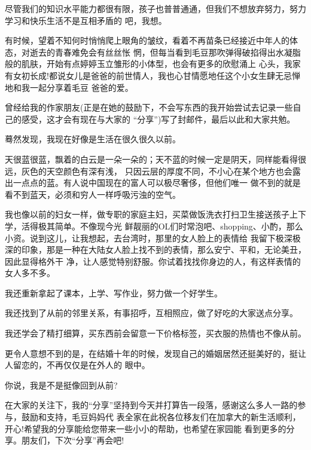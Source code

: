 \documentclass[11pt,a4paper,onecolumn]{article}
\begin{document}
尽管我们的知识水平能力都很有限，孩子也普普通通，但我们不想放弃努力，努力学习和快乐生活不是互相矛盾的
吧，我想。



有时候，望着不知何时悄悄爬上眼角的皱纹，看着不再苗条已经接近中年人的体态，对逝去的青春难免会有丝丝怅
惘，但每当看到毛豆那吹弹得破掐得出水凝脂般的肌肤，开始有点婷婷玉立雏形的小体型，也会有更多的欣慰涌上
心头，我家有女初长成!都说女儿是爸爸的前世情人，我也心甘情愿地任这个小女生肆无忌惮地和我一起分享着毛豆
爸爸的爱。


曾经给我的作家朋友(正是在她的鼓励下，不会写东西的我开始尝试去记录一些自己的感受，这才会有现在与大家的
``分享'')写了封邮件，最后以此和大家共勉。



蓦然发现，我现在好像是生活在很久很久以前。


天很蓝很蓝，飘着的白云是一朵一朵的；天不蓝的时候一定是阴天，同样能看得很远，灰色的天空颜色有深有浅，
只因云层的厚度不同，不小心在某个地方也会露出一点点的蓝。有人说中国现在的富人可以极尽奢侈，但他们唯一
做不到的就是看不到蓝天，必须和穷人一样呼吸污浊的空气。


我也像以前的妇女一样，做专职的家庭主妇，买菜做饭洗衣打扫卫生接送孩子上下学，活得极其简单。不像现今光
鲜靓丽的OL们时常泡吧、shopping、小酌，那么小资。说到这儿，让我想起，去台湾时，那里的女人脸上的表情给
我留下极深极深的印象，那是一种在大陆女人脸上找不到的表情，那么安宁、平和，无论美丑，因此显得格外干
净，让人感觉特别舒服。你试着找找你身边的人，有这样表情的女人多不多。


我还重新拿起了课本，上学、写作业，努力做一个好学生。


我还找到了从前的邻里关系，有事招呼，互相照应，做了好吃的大家送点分享。


我还学会了精打细算，买东西前会留意一下价格标签，买衣服的热情也不像从前。


更令人意想不到的是，在结婚十年的时候，发现自己的婚姻居然还挺美好的，挺让人留恋的，不再仅仅是在外人的
眼中。


你说，我是不是挺像回到从前?


在大家的关注下，我的``分享''坚持到今天并打算告一段落，感谢这么多人一路的参与，鼓励和支持，毛豆妈妈代
表全家在此祝各位移友们在加拿大的新生活顺利，开心!希望我的分享能给您带来一些小小的帮助，也希望在家园能
看到更多的分享。朋友们，下次``分享''再会吧!
\end{document}
